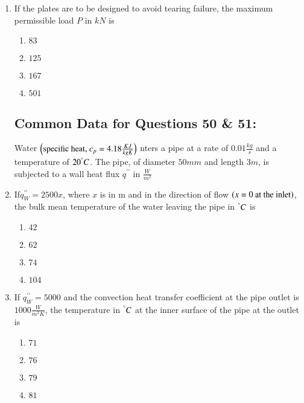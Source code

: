 \documentclass[journal]{IEEEtran}
\numberwithin{equation}{enumi}
\numberwithin{figure}{enumi}
\begin{document}
\begin{enumerate}
    \item 
    If the plates are to be designed to avoid tearing failure, the maximum permissible load $P$ in $kN$ is

    \begin{multicols}{4}
        \begin{enumerate}
            \item $83$
            \item $125$
            \item $167$
            \item $501$
        \end{enumerate}
    \end{multicols}


    \subsection{Common Data for Questions 50 \& 51:}
    Water $\left(\text{specific heat, } c_p = 4.18 \frac{KJ}{kgK}\right)$ nters a pipe at a rate of $0.01 \frac{kg}{s}$ and a temperature of $20^\degree C$. The pipe, of diameter $50 mm$ and length $3 m$, is subjected to a wall heat flux $q^{\prime\prime}$ in $\frac{W}{m^2}$\\
    
    \item 
    If$q_W^{\prime\prime} = 2500x $, where $x$ is in m and in the direction of flow $\left(x = 0\text{ at the inlet}\right)$, the bulk mean temperature of the water leaving the pipe in $^\degree C$ is

    \begin{multicols}{4}
        \begin{enumerate}
            \item $42$
            \item $62$
            \item $74$
            \item $104$
        \end{enumerate}
    \end{multicols}

    \item
    If $q_W^{\prime\prime} = 5000$ and the convection heat transfer coefficient at the pipe outlet is $1000\frac{W}{m^2K}$, the temperature in $^\degree C$ at the inner surface of the pipe at the outlet is

    \begin{multicols}{4}
        \begin{enumerate}
            \item $71$
            \item $76$
            \item $79$
            \item $81$
        \end{enumerate}
    \end{multicols}


\end{enumerate}
\end{document}
